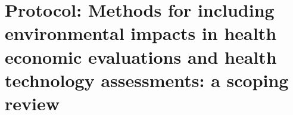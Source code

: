 \chapter{Protocol: Methods for including environmental impacts in health economic evaluations and health technology assessments: a scoping review}
\label{ap-c}

